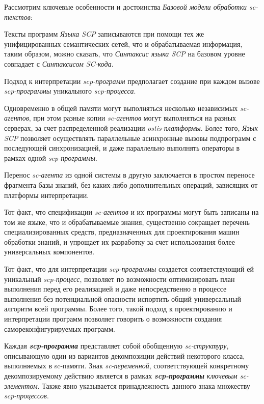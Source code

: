 Рассмотрим ключевые особенности и достоинства \textit{Базовой модели обработки sc-текстов}:
\begin{textitemize}
	\item Тексты программ \textit{Языка SCP} записываются при помощи тех же унифицированных семантических сетей, что и обрабатываемая информация, таким образом, можно сказать, что \textit{Синтаксис языка SCP} на базовом уровне совпадает с \textit{Синтаксисом SC-кода}.\item Подход к интерпретации \textit{scp-программ} предполагает создание при	каждом вызове \textit{scp-программы} уникального \textit{scp-процесса}.
	\item Одновременно в общей памяти могут выполняться несколько независимых \textit{sc-агентов}, при этом разные копии \textit{sc-агентов} могут выполняться на разных серверах, за счет распределенной реализации \textit{ostis-платформы}. Более того, \textit{Язык SCP} позволяет осуществлять параллельные асинхронные вызовы подпрограмм с последующей синхронизацией, и даже параллельно	выполнять операторы в рамках одной \textit{scp-программы}.
	\item Перенос \textit{sc-агента} из одной системы в другую заключается в простом переносе фрагмента базы знаний, без каких-либо дополнительных операций, зависящих от платформы интерпретации.
	\item Тот факт, что спецификации \textit{sc-агентов} и их программы могут быть записаны на том же языке, что и обрабатываемые знания, существенно сокращает перечень специализированных средств, предназначенных для проектирования машин обработки знаний, и упрощает их разработку за
	счет использования более универсальных компонентов.
	\item Тот факт, что для интерпретации \textit{scp-программы} создается соответствующий ей уникальный \textit{\mbox{scp-процесс}}, позволяет по возможности оптимизировать план выполнения перед его реализацией и
	даже непосредственно в процессе выполнения без потенциальной опасности испортить общий универсальный алгоритм всей программы. Более того, такой подход к проектированию и интерпретации программ позволяет говорить о возможности создания самореконфигурируемых программ.
\end{textitemize}

\begin{SCn}
\end{SCn}

Каждая \textbf{\textit{scp-программа}} представляет собой обобщенную \textit{sc-структуру}, описывающую один из вариантов декомпозиции действий некоторого класса, выполняемых в sc-памяти. Знак \textit{sc-переменной}, соответствующей конкретному декомпозируемому действию является в рамках \textbf{\textit{scp-программы}} \textit{ключевым sc-элементом\scnrolesign}. Также явно указывается принадлежность данного знака множеству \textit{scp-процессов}.
	
